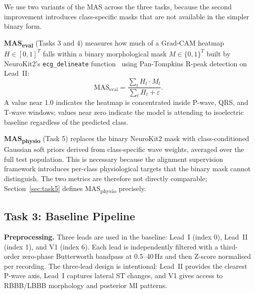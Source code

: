 \documentclass{article}
\begin{document}
We use two variants of the MAS across the three tasks, because the
second improvement introduces class-specific masks that are not
available in the simpler binary form.

\textbf{MAS\textsubscript{eval}} (Tasks 3 and 4) measures how much of a
Grad-CAM heatmap $H \in [0,1]^T$ falls within a binary
morphological mask $M \in \{0,1\}^T$ built by NeuroKit2's
\texttt{ecg\_delineate} function~\cite{makowski2021,pantompkins1985}
using Pan-Tompkins R-peak detection on Lead~II:
\begin{equation}
\mathrm{MAS_{eval}} = \frac{\sum_t H_t \cdot M_t}{\sum_t H_t + \varepsilon}.
\label{eq:mas_eval}
\end{equation}
A value near 1.0 indicates the heatmap is concentrated inside
P-wave, QRS, and T-wave windows; values near zero indicate the model
is attending to isoelectric baseline regardless of the predicted
class.

\textbf{MAS\textsubscript{physio}} (Task 5) replaces the binary NeuroKit2
mask with class-conditioned Gaussian soft priors derived from
class-specific wave weights, averaged over the full test population.
This is necessary because the alignment supervision framework
introduces per-class physiological targets that the binary mask
cannot distinguish. The two metrics are therefore not directly
comparable; Section~\ref{sec:task5} defines MAS\textsubscript{physio}
precisely.

\subsection{Task 3: Baseline Pipeline}
\label{sec:task3}

\textbf{Preprocessing.}
Three leads are used in the baseline: Lead~I (index 0), Lead~II
(index 1), and V1 (index 6). Each lead is independently filtered
with a third-order zero-phase Butterworth bandpass at 0.5--40\,Hz
and then Z-score normalised per recording. The three-lead design is
intentional: Lead~II provides the clearest P-wave axis, Lead~I
captures lateral ST changes, and V1 gives access to RBBB/LBBB
morphology and posterior MI patterns.
\end{document}
